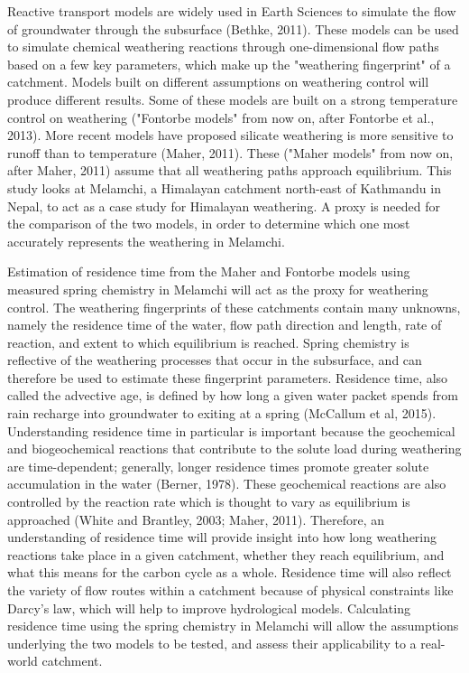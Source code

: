 \bsk

Reactive transport models are widely used in Earth Sciences to simulate the flow of groundwater through the subsurface (Bethke, 2011). These models can be used to simulate chemical weathering reactions through one-dimensional flow paths based on a few key parameters, which make up the "weathering fingerprint" of a catchment. Models built on different assumptions on weathering control will produce different results. Some of these models are built on a strong temperature control on weathering ("Fontorbe models" from now on, after Fontorbe et al., 2013). More recent models have proposed silicate weathering is more sensitive to runoff than to temperature (Maher, 2011). These ("Maher models" from now on, after Maher, 2011) assume that all weathering paths approach equilibrium. This study looks at Melamchi, a Himalayan catchment north-east of Kathmandu in Nepal, to act as a case study for Himalayan weathering. A proxy is needed for the comparison of the two models, in order to determine which one most accurately represents the weathering in Melamchi.

\bsk

Estimation of residence time from the Maher and Fontorbe models using measured spring chemistry in Melamchi will act as the proxy for weathering control. The weathering fingerprints of these catchments contain many unknowns, namely the residence time of the water, flow path direction and length, rate of reaction, and extent to which equilibrium is reached. Spring chemistry is reflective of the weathering processes that occur in the subsurface, and can therefore be used to estimate these fingerprint parameters. Residence time, also called the advective age, is defined by how long a given water packet spends from rain recharge into groundwater to exiting at a spring (McCallum et al, 2015). Understanding residence time in particular is important because the geochemical and biogeochemical reactions that contribute to the solute load during weathering are time-dependent; generally, longer residence times promote greater solute accumulation in the water (Berner, 1978). These geochemical reactions are also controlled by the reaction rate which is thought to vary as equilibrium is approached (White and Brantley, 2003; Maher, 2011). Therefore, an understanding of residence time will provide insight into how long weathering reactions take place in a given catchment, whether they reach equilibrium, and what this means for the carbon cycle as a whole. Residence time will also reflect the variety of flow routes within a catchment because of physical constraints like Darcy's law, which will help to improve hydrological models. Calculating residence time using the spring chemistry in Melamchi will allow the assumptions underlying the two models to be tested, and assess their applicability to a real-world catchment.

